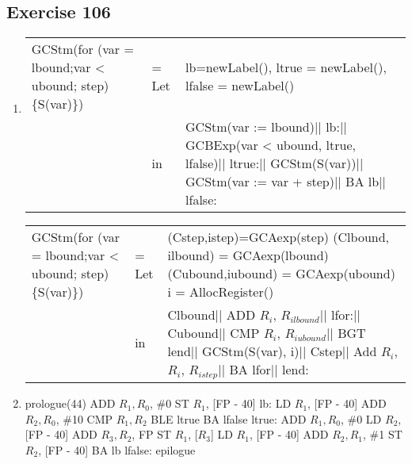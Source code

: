 \documentclass[12pt,fleqn]{article}		%
\begin{document}
\subsection{Exercise 106}
\begin{enumerate}
\item
\begin{tabularx}{\textwidth}{| X l X |}
\hline
GCStm(for (var = lbound;\newline var < ubound; step)\newline \{S(var)\}) & = Let & lb=newLabel(),\newline
ltrue = newLabel(),\newline
lfalse = newLabel()\\
& in & GCStm(var := lbound)||\newline
lb:||\newline
GCBExp(var < ubound, ltrue, lfalse)||\newline
ltrue:||\newline
GCStm(S(var))||\newline
GCStm(var := var + step)||\newline
BA lb||\newline
lfalse:
\\
\hline
\end{tabularx}
\begin{tabularx}{\textwidth}{| X l X |}
\hline
GCStm(for (var = lbound;\newline var < ubound; step)\newline \{S(var)\}) & = Let & (Cstep,istep)=GCAexp(step)\newline
(Clbound, ilbound) = GCAexp(lbound)\newline
(Cubound,iubound) = GCAexp(ubound)\newline
i = AllocRegister()\\
& in & Clbound||\newline
ADD $R_i$, $R_{ilbound}$||\newline
lfor:||\newline
Cubound||\newline
CMP $R_i$, $R_{iubound}$||\newline
BGT lend||\newline
GCStm(S(var), i)||\newline
Cstep||\newline
Add $R_i$, $R_i$, $R_{istep}$||\newline
BA lfor||\newline
lend:
\\
\hline
\end{tabularx}
\item
\begin{algorithmic}
\State prologue(44)
\State ADD $R_1, R_0$, \#0
\State ST $R_1$, [FP - 40]
\State lb:
\State LD $R_1$, [FP - 40]
\State ADD $R_2, R_0$, \#10
\State CMP $R_1, R_2$
\State BLE ltrue
\State BA lfalse
\State ltrue:
\State ADD $R_1, R_0$, \#0
\State LD $R_2$, [FP - 40]
\State ADD $R_3, R_2$, FP
\State ST $R_1$, [$R_3$]
\State LD $R_1$, [FP - 40]
\State ADD $R_2, R_1$, \#1
\State ST $R_2$, [FP - 40]
\State BA lb
\State lfalse:
\State epilogue
\end{algorithmic}


\end{enumerate}
\end{document}

